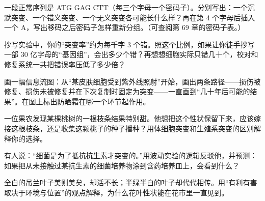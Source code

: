 \begin{sikaoti}
\item 一段正常序列是 ATG GAG CTT（每三个字母一个密码子）。分别写出：一个沉默突变、一个错义突变、一个无义突变各可能长什么样？再在第 4 个字母后插入一个 A，写出移码之后密码子怎样重新分组。（可查阅第 69 章的密码子表。）
\item 抄写实验中，你的“突变率”约为每千字 3 个错。照这个比例，如果让你徒手抄写一部 30 亿字母的“基因组”，会出多少个错？再想想细胞实际只错几十个，校对和修复系统一共把错误率压低了多少倍？
\item 画一幅信息流图：从“某皮肤细胞受到紫外线照射”开始，画出两条路径——损伤被修复、损伤未被修复并在下次复制时固定为突变——一直画到“几十年后可能的结果”。在图上标出防晒霜在哪一个环节起作用。
\item 一位果农发现某棵桃树的一根枝条结果特别甜。他想把这个性状保留下来，应该嫁接这根枝条，还是收集这颗桃子的种子播种？用体细胞突变和生殖系突变的区别解释你的选择。
\item 有人说：“细菌是为了抵抗抗生素才突变的。”用波动实验的逻辑反驳他，并预测：如果把从未接触过某抗生素的细菌培养物涂到含药培养皿上，会看到什么？
\item 全白的吊兰叶子美则美矣，却活不长；半绿半白的叶子却代代相传。用“有利有害取决于环境与位置”的观点解释，为什么花叶性状能在花市里一直见到。
\end{sikaoti}
